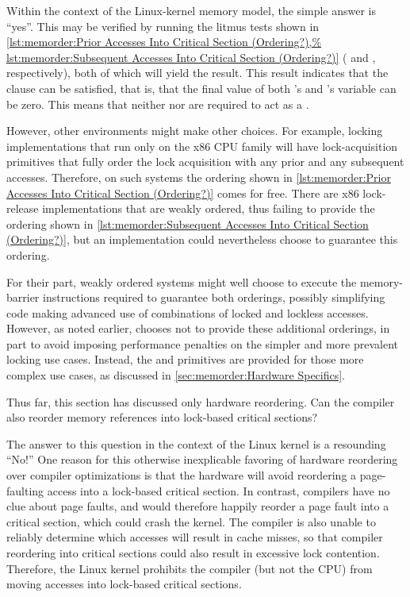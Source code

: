 Within the context of the Linux-kernel memory model, the simple answer
is ``yes''.
This may be verified by running the litmus tests shown in
\cref{lst:memorder:Prior Accesses Into Critical Section (Ordering?),%
lst:memorder:Subsequent Accesses Into Critical Section (Ordering?)}
( and ,
respectively), both of which will yield the  result.
This result indicates that the  clause can be satisfied, that
is, that the final value of both 's and 's  variable
can be zero.
This means that neither  nor 
are required to act as a .

However, other environments might make other choices.
For example, locking implementations that run only on the x86 CPU
family will have lock-acquisition primitives that fully order the lock
acquisition with any prior and any subsequent accesses.
Therefore, on such systems the ordering shown in
\cref{lst:memorder:Prior Accesses Into Critical Section (Ordering?)}
comes for free.
There are x86 lock-release implementations that are weakly ordered,
thus failing to provide the ordering shown in
\cref{lst:memorder:Subsequent Accesses Into Critical Section (Ordering?)},
but an implementation could nevertheless choose to guarantee this ordering.

For their part, weakly ordered systems might well choose to execute
the memory-barrier instructions required to guarantee both orderings,
possibly simplifying code making advanced use of combinations of locked
and lockless accesses.
However, as noted earlier, 
chooses not to provide these additional
orderings, in part to avoid imposing performance penalties on the simpler
and more prevalent locking use cases.
Instead, the  and 
primitives are provided for those more complex use cases, as discussed
in \cref{sec:memorder:Hardware Specifics}.

Thus far, this section has discussed only hardware reordering.
Can the compiler also reorder memory references into lock-based
critical sections?

The answer to this question in the context of the Linux kernel is a
resounding ``No!''
One reason for this otherwise inexplicable favoring of hardware reordering
over compiler optimizations is that the hardware will avoid reordering
a page-faulting access into a lock-based critical section.
In contrast, compilers have no clue about page faults, and would
therefore happily reorder a page fault into a critical section, which
could crash the kernel.
The compiler is also unable to reliably determine which accesses
will result in cache misses, so that compiler reordering into critical
sections could also result in excessive lock contention.
Therefore, the Linux kernel prohibits the compiler (but not the CPU)
from moving accesses into lock-based critical sections.

